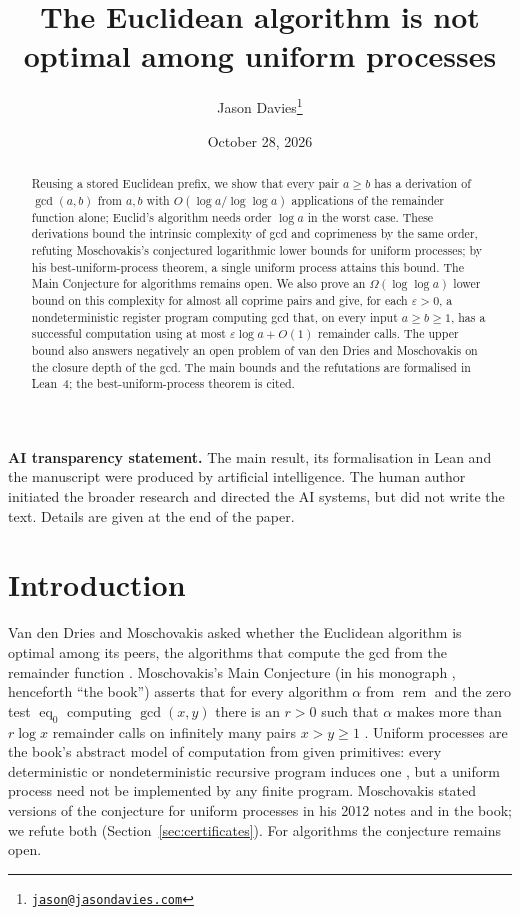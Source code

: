 \documentclass[11pt]{article}
\title{The Euclidean algorithm is not optimal among uniform processes}
\author{Jason Davies\thanks{\href{mailto:jason@jasondavies.com}{\nolinkurl{jason@jasondavies.com}}}}
\date{October 28, 2026}
\theoremstyle{remark}
\newcommand{\rem}{\operatorname{rem}}
\newcommand{\eq}{\operatorname{eq}}
\begin{document}
\maketitle
\begin{abstract}
Reusing a stored Euclidean prefix, we show that every pair $a\geq b$ has a
derivation of $\gcd(a,b)$ from $a,b$ with $O(\log a/\log\log a)$
applications of the remainder function alone; Euclid's algorithm needs order $\log a$ in the
worst case. These derivations bound the intrinsic complexity
of gcd and coprimeness by the same order, refuting Moschovakis's conjectured
logarithmic lower bounds for uniform processes; by his best-uniform-process
theorem, a single uniform process attains this bound.
The Main Conjecture for algorithms remains open. We also prove an
$\Omega(\log\log a)$ lower bound on this complexity for almost all coprime
pairs and give,
for each $\varepsilon>0$, a nondeterministic register program computing gcd
that, on every input $a\geq b\geq1$, has a successful computation using at
most $\varepsilon\log a+O(1)$ remainder calls. The upper bound also answers
negatively an open problem of van den Dries and Moschovakis on the closure
depth of the gcd. The main bounds and the
refutations are formalised in Lean~4; the best-uniform-process theorem is cited.
\end{abstract}

\noindent\textbf{AI transparency statement.} The main result, its
formalisation in Lean and the manuscript were produced by artificial
intelligence. The human author initiated the broader research and directed
the AI systems, but did not write the text. Details are given at the end of
the paper.

\section{Introduction}\label{sec:intro}
Van den Dries and Moschovakis asked whether the Euclidean algorithm is optimal
among its peers, the algorithms that compute the gcd from the remainder
function \cite[p.~390]{vddm2004}. Moschovakis's Main Conjecture (in his
monograph \cite{moschovakis2019}, henceforth ``the book'') asserts that for every
algorithm $\alpha$ from $\rem$ and the zero test $\eq_0$ computing
$\gcd(x,y)$ there is an $r>0$ such that $\alpha$ makes more than $r\log x$
remainder calls on infinitely many pairs $x>y\geq1$
\cite[p.~2]{moschovakis2019}. Uniform processes are the book's abstract
model of computation from given primitives: every deterministic or
nondeterministic recursive program induces one
\cite[\S4A, Proposition~4A.1]{moschovakis2019}, but a uniform process need
not be implemented by any finite program. Moschovakis stated versions of
the conjecture for uniform processes in his 2012 notes and in the book; we
refute both (Section~\ref{sec:certificates}). For algorithms the conjecture
remains open.
\end{document}
